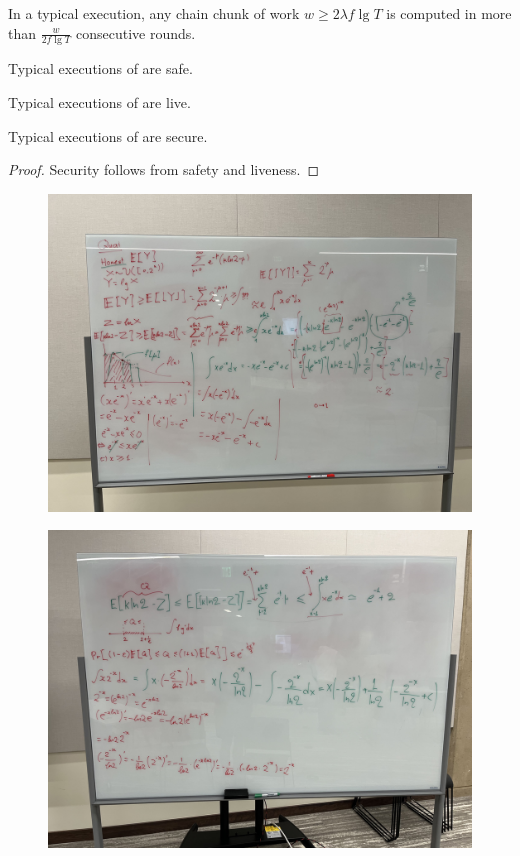 \begin{conjecture}
  In a typical execution, any chain chunk of work $w \geq 2 \lambda f \lg T$ is computed
  in more than $\frac{w}{2 f \lg T}$ consecutive rounds.
\end{conjecture}

\begin{conjecture}
  Typical executions of \poem are safe.
\end{conjecture}

\begin{conjecture}
  Typical executions of \poem are live.
\end{conjecture}

\begin{corollary}
  Typical executions of \poem are secure.
\end{corollary}
\begin{proof}
  Security follows from safety and liveness.
  \Qed
\end{proof}

\begin{figure}[h]
    \centering
    \includegraphics[width=1\textwidth]{figures/bounds-1.jpeg}
\end{figure}

\begin{figure}[h]
    \centering
    \includegraphics[width=1\textwidth]{figures/bounds-2.jpeg}
\end{figure}
